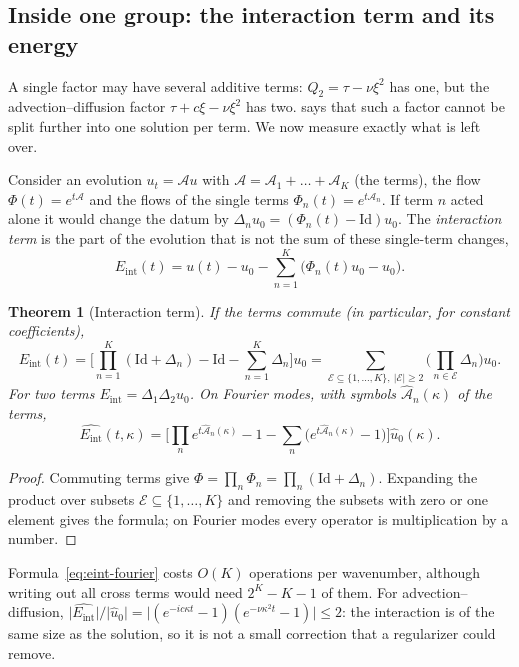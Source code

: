 \documentclass[11pt]{article}
\theoremstyle{plain}
\newtheorem{theorem}{Theorem}[section]
\theoremstyle{definition}
\theoremstyle{remark}
\newcommand{\Id}{\mathrm{Id}}
\newcommand{\Eint}{E_{\mathrm{int}}}        %
\newcommand{\flow}{\Phi}                    %
\newcommand{\abs}[1]{\lvert#1\rvert}
\begin{document}
\subsection{Inside one group: the interaction term and its energy}\label{sec:eint}
A single factor may have several additive terms: $Q_2=\tau-\nu\xi^2$ has one, but the advection--diffusion
factor $\tau+c\xi-\nu\xi^2$ has two.  says that such a factor cannot be split further
into one solution per term. We now measure exactly what is left over.

Consider an evolution $u_t=\mathcal Au$ with $\mathcal A=\mathcal A_1+\dots+\mathcal A_K$ (the terms), the flow $\flow(t)=e^{t\mathcal A}$ and the
flows of the single terms $\flow_n(t)=e^{t\mathcal A_n}$. If term $n$ acted alone it would change the datum by
$\Delta_nu_0=(\flow_n(t)-\Id)u_0$. The \emph{interaction term} is the part of the evolution that is not
the sum of these single-term changes,
\begin{equation}\label{eq:eint-def}
  \Eint(t)=u(t)-u_0-\sum_{n=1}^K\big(\flow_n(t)u_0-u_0\big).
\end{equation}

\begin{theorem}[Interaction term]\label{thm:eint}
If the terms commute (in particular, for constant coefficients),
\[
  \Eint(t)=\Big[\prod_{n=1}^K(\Id+\Delta_n)-\Id-\sum_{n=1}^K\Delta_n\Big]u_0
  =\sum_{\mathcal E\subseteq\{1,\dots,K\},\ \abs{\mathcal E}\ge2}\Big(\prod_{n\in\mathcal E}\Delta_n\Big)u_0 .
\]
For two terms $\Eint=\Delta_1\Delta_2u_0$. On Fourier modes, with symbols $\hat{\mathcal A}_n(\kappa)$ of the terms,
\begin{equation}\label{eq:eint-fourier}
  \widehat{\Eint}(t,\kappa)=\Big[\prod_ne^{t\hat{\mathcal A}_n(\kappa)}-1-\sum_n\big(e^{t\hat{\mathcal A}_n(\kappa)}-1\big)\Big]\hat u_0(\kappa).
\end{equation}
\end{theorem}

\begin{proof}
Commuting terms give $\flow=\prod_n\flow_n=\prod_n(\Id+\Delta_n)$. Expanding the product over subsets
$\mathcal E\subseteq\{1,\dots,K\}$ and removing the subsets with zero or one element gives the formula; on
Fourier modes every operator is multiplication by a number.
\end{proof}

Formula~\eqref{eq:eint-fourier} costs $O(K)$ operations per wavenumber, although writing out all
cross terms would need $2^K-K-1$ of them. For advection--diffusion,
$\abs{\widehat{\Eint}}/\abs{\hat u_0}=\abs{(e^{-ic\kappa t}-1)(e^{-\nu\kappa^2t}-1)}\le2$: the interaction
is of the same size as the solution, so it is not a small correction that a regularizer could remove.
\end{document}
